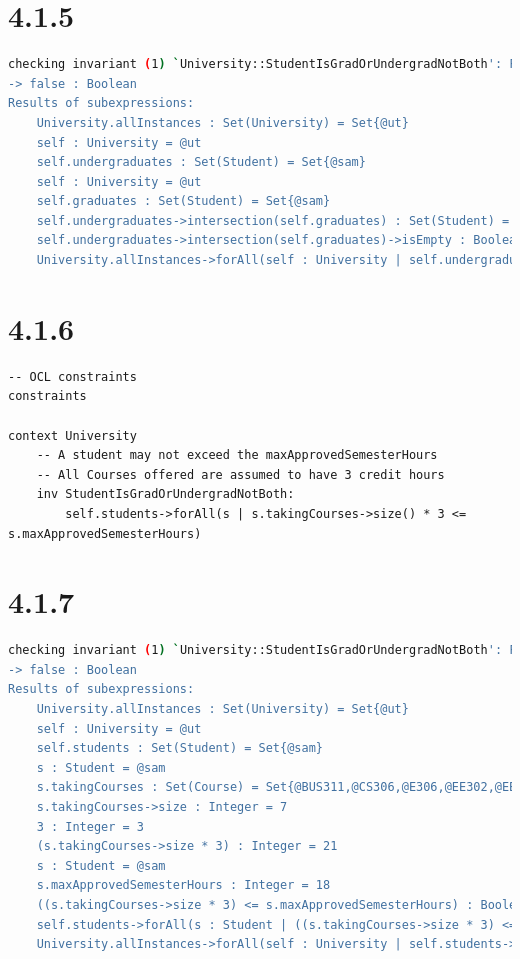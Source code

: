 \documentclass{article}
\begin{document}
  \section*{4.1.5}
\begin{lstlisting}[language=bash]
checking invariant (1) `University::StudentIsGradOrUndergradNotBoth': FAILED.
-> false : Boolean
Results of subexpressions:
	University.allInstances : Set(University) = Set{@ut}
	self : University = @ut
	self.undergraduates : Set(Student) = Set{@sam}
	self : University = @ut
	self.graduates : Set(Student) = Set{@sam}
	self.undergraduates->intersection(self.graduates) : Set(Student) = Set{@sam}
	self.undergraduates->intersection(self.graduates)->isEmpty : Boolean = false
	University.allInstances->forAll(self : University | self.undergraduates->intersection(self.graduates)->isEmpty) : Boolean = false
\end{lstlisting}
 \section*{4.1.6}
 \begin{lstlisting}
-- OCL constraints
constraints

context University
	-- A student may not exceed the maxApprovedSemesterHours
	-- All Courses offered are assumed to have 3 credit hours
	inv StudentIsGradOrUndergradNotBoth:
		self.students->forAll(s | s.takingCourses->size() * 3 <= s.maxApprovedSemesterHours)
\end{lstlisting}
\section*{4.1.7}
\begin{lstlisting}[language=bash]
checking invariant (1) `University::StudentIsGradOrUndergradNotBoth': FAILED.
-> false : Boolean
Results of subexpressions:
	University.allInstances : Set(University) = Set{@ut}
	self : University = @ut
	self.students : Set(Student) = Set{@sam}
	s : Student = @sam
	s.takingCourses : Set(Course) = Set{@BUS311,@CS306,@E306,@EE302,@EE323,@EE338,@EE379K}
	s.takingCourses->size : Integer = 7
	3 : Integer = 3
	(s.takingCourses->size * 3) : Integer = 21
	s : Student = @sam
	s.maxApprovedSemesterHours : Integer = 18
	((s.takingCourses->size * 3) <= s.maxApprovedSemesterHours) : Boolean = false
	self.students->forAll(s : Student | ((s.takingCourses->size * 3) <= s.maxApprovedSemesterHours)) : Boolean = false
	University.allInstances->forAll(self : University | self.students->forAll(s : Student | ((s.takingCourses->size * 3) <= s.maxApprovedSemesterHours))) : Boolean = false
\end{lstlisting}
\end{document}
